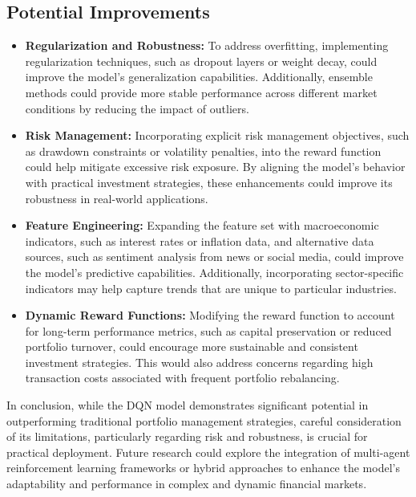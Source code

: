 \documentclass[conference]{IEEEtran}
\begin{document}
\subsection{Potential Improvements}
\begin{itemize}
  \item \textbf{Regularization and Robustness:} To address overfitting, implementing regularization techniques, such as dropout layers or weight decay, could improve the model's generalization capabilities. Additionally, ensemble methods could provide more stable performance across different market conditions by reducing the impact of outliers.
  \item \textbf{Risk Management:} Incorporating explicit risk management objectives, such as drawdown constraints or volatility penalties, into the reward function could help mitigate excessive risk exposure. By aligning the model's behavior with practical investment strategies, these enhancements could improve its robustness in real-world applications.
  \item \textbf{Feature Engineering:} Expanding the feature set with macroeconomic indicators, such as interest rates or inflation data, and alternative data sources, such as sentiment analysis from news or social media, could improve the model's predictive capabilities. Additionally, incorporating sector-specific indicators may help capture trends that are unique to particular industries.
  \item \textbf{Dynamic Reward Functions:} Modifying the reward function to account for long-term performance metrics, such as capital preservation or reduced portfolio turnover, could encourage more sustainable and consistent investment strategies. This would also address concerns regarding high transaction costs associated with frequent portfolio rebalancing.
\end{itemize}

In conclusion, while the DQN model demonstrates significant potential in outperforming traditional portfolio management strategies, careful consideration of its limitations, particularly regarding risk and robustness, is crucial for practical deployment. Future research could explore the integration of multi-agent reinforcement learning frameworks or hybrid approaches to enhance the model's adaptability and performance in complex and dynamic financial markets.
\end{document}
